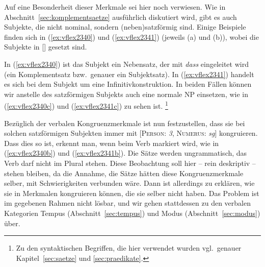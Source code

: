 Auf eine Besonderheit dieser Merkmale sei hier noch verwiesen.
Wie in Abschnitt~\ref{sec:komplementsaetze} ausführlich diskutiert wird, gibt es auch Subjekte, die nicht nominal, sondern (neben)satzförmig sind.
Einige Beispiele finden sich in (\ref{ex:vflex2340}) und (\ref{ex:vflex2341}) (jeweils (a) und (b)), wobei die Subjekte in [] gesetzt sind.

\begin{exe}
  \ex\label{ex:vflex2340}
  \begin{xlist}
  \end{xlist}
  \ex\label{ex:vflex2341}
  \begin{xlist}
  \end{xlist}
\end{exe}

In (\ref{ex:vflex2340}) ist das Subjekt ein Nebensatz, der mit \textit{dass} eingeleitet wird (ein Komplementsatz bzw.\ genauer ein Subjektsatz).
In (\ref{ex:vflex2341}) handelt es sich bei dem Subjekt um eine Infinitivkonstruktion.
In beiden Fällen können wir anstelle des satzförmigen Subjekts auch eine normale NP einsetzen, wie in (\ref{ex:vflex2340c}) und (\ref{ex:vflex2341c}) zu sehen ist.%
\footnote{Zu den syntaktischen Begriffen, die hier verwendet wurden vgl.\ genauer Kapitel~\ref{sec:saetze} und \ref{sec:praedikate}.}

Bezüglich der verbalen Kongruenzmerkmale ist nun festzustellen, dass sie bei solchen satzförmigen Subjekten immer mit [\textsc{Person}: \textit{3}, \textsc{Numerus}: \textit{sg}] kongruieren.
Dass dies so ist, erkennt man, wenn  beim Verb markiert wird, wie in (\ref{ex:vflex2340b}) und (\ref{ex:vflex2341b}).
Die Sätze werden ungrammatisch, das Verb darf nicht im Plural stehen.
Diese Beobachtung soll hier -- rein deskriptiv -- stehen bleiben, da die Annahme, die Sätze hätten diese Kongruenzmerkmale selber, mit Schwierigkeiten verbunden wäre.
Dann ist allerdings zu erklären, wie sie in Merkmalen kongruieren können, die sie selber nicht haben.
Das Problem ist im gegebenen Rahmen nicht lösbar, und wir gehen stattdessen zu den verbalen Kategorien Tempus (Abschnitt~\ref{sec:tempus}) und Modus (Abschnitt~\ref{sec:modus}) über.


